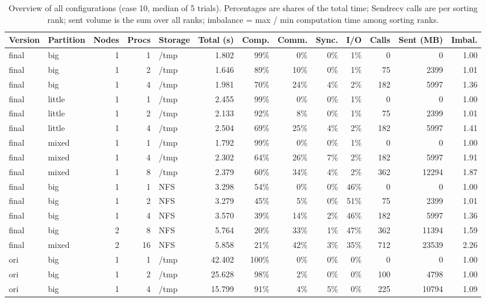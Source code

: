 \begin{table}[htbp]
\centering
\caption{Overview of all configurations (case 10, median of 5 trials). Percentages are shares of the total time; Sendrecv calls are per sorting rank; sent volume is the sum over all ranks; imbalance = max / min computation time among sorting ranks.}
\label{tab:overview}
\begin{tabular}{llrrlrrrrrrrr}
\toprule
Version & Partition & Nodes & Procs & Storage & Total (s) & Comp. & Comm. & Sync. & I/O & Calls & Sent (MB) & Imbal. \\
\midrule
final & big & 1 & 1 & /tmp & 1.802 & 99\% & 0\% & 0\% & 1\% & 0 & 0 & 1.00 \\
final & big & 1 & 2 & /tmp & 1.646 & 89\% & 10\% & 0\% & 1\% & 75 & 2399 & 1.01 \\
final & big & 1 & 4 & /tmp & 1.981 & 70\% & 24\% & 4\% & 2\% & 182 & 5997 & 1.36 \\
final & little & 1 & 1 & /tmp & 2.455 & 99\% & 0\% & 0\% & 1\% & 0 & 0 & 1.00 \\
final & little & 1 & 2 & /tmp & 2.133 & 92\% & 8\% & 0\% & 1\% & 75 & 2399 & 1.01 \\
final & little & 1 & 4 & /tmp & 2.504 & 69\% & 25\% & 4\% & 2\% & 182 & 5997 & 1.41 \\
final & mixed & 1 & 1 & /tmp & 1.792 & 99\% & 0\% & 0\% & 1\% & 0 & 0 & 1.00 \\
final & mixed & 1 & 4 & /tmp & 2.302 & 64\% & 26\% & 7\% & 2\% & 182 & 5997 & 1.91 \\
final & mixed & 1 & 8 & /tmp & 2.379 & 60\% & 34\% & 4\% & 2\% & 362 & 12294 & 1.87 \\
final & big & 1 & 1 & NFS & 3.298 & 54\% & 0\% & 0\% & 46\% & 0 & 0 & 1.00 \\
final & big & 1 & 2 & NFS & 3.279 & 45\% & 5\% & 0\% & 51\% & 75 & 2399 & 1.01 \\
final & big & 1 & 4 & NFS & 3.570 & 39\% & 14\% & 2\% & 46\% & 182 & 5997 & 1.36 \\
final & big & 2 & 8 & NFS & 5.764 & 20\% & 33\% & 1\% & 47\% & 362 & 11394 & 1.59 \\
final & mixed & 2 & 16 & NFS & 5.858 & 21\% & 42\% & 3\% & 35\% & 712 & 23539 & 2.26 \\
ori & big & 1 & 1 & /tmp & 42.402 & 100\% & 0\% & 0\% & 0\% & 0 & 0 & 1.00 \\
ori & big & 1 & 2 & /tmp & 25.628 & 98\% & 2\% & 0\% & 0\% & 100 & 4798 & 1.00 \\
ori & big & 1 & 4 & /tmp & 15.799 & 91\% & 4\% & 5\% & 0\% & 225 & 10794 & 1.09 \\

\end{tabular}
\end{table}
